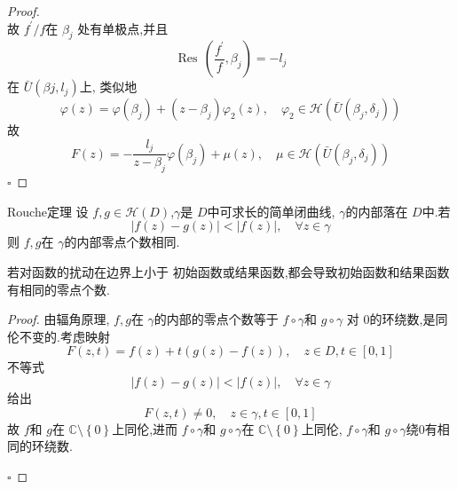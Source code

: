 \documentclass[../../复变函数.tex]{subfiles}
\begin{document}
\begin{proof}
\[    \]故 \(  f^{\prime} /f  \)在 \(  \beta _{j}  \)        处有单极点,并且 \[
    \operatorname{Res}\, \left( \frac{f^{\prime}  }{f },\beta _{j}  \right)= -l_{j} 
    \]
    在 \(  \bar{U}\left( \beta j ,l_{j}\right)   \)上, 类似地\[
     \varphi \left( z \right)=  \varphi \left( \beta _{j} \right)+ \left( z-\beta _{j} \right) \varphi _2 \left( z \right),\quad  \varphi _2 \in \mathcal{H}\left( \bar{U}\left( \beta _{j} , \delta  _{j}\right)  \right)     
    \] 故 \[
    F\left( z \right)= -\frac{l_{j} }{z-\beta _{j} } \varphi \left( \beta _{j} \right)+ \mu \left( z \right),\quad \mu \in \mathcal{H}\left( \bar{U}\left( \beta _{j}, \delta  _{j} \right)  \right)     
    \]
    \hfill $\square$
\end{proof}



\begin{theorem}{Rouche定理}
    设 \(  f,g\in \mathcal{H}\left( D \right)   \),\(   \gamma   \)是 \(  D  \)中可求长的简单闭曲线, \(   \gamma   \)的内部落在 \(  D  \)中.若 \[
    \left| f\left( z \right)-g\left( z \right)   \right|< \left| f\left( z \right)  \right|,\quad \forall z \in  \gamma   
    \]则 \(  f,g  \)在 \(   \gamma   \)的内部零点个数相同.       
\end{theorem}

\begin{note}
    若对函数的扰动在边界上小于 初始函数或结果函数,都会导致初始函数和结果函数有相同的零点个数.
\end{note}
\begin{proof}
    由辐角原理, \(  f,g  \)在 \(   \gamma   \)的内部的零点个数等于 \(  f\circ  \gamma   \)和 \(  g\circ  \gamma   \)  对 \(  0  \)的环绕数,是同伦不变的.考虑映射 \[
    F\left( z,t \right)= f\left( z \right)+ t\left( g\left( z \right)-f\left( z \right)   \right) , \quad z\in D,t \in \left[ 0,1 \right]    
    \] 不等式 \[
    \left| f\left( z \right)-g\left( z \right)   \right|< \left| f\left( z \right)  \right|,\quad \forall z \in  \gamma   
    \]给出 \[
    F\left( z,t \right)\neq 0,\quad z \in  \gamma ,t \in \left[ 0,1 \right]  
    \]故 \(  f  \)和 \(  g  \)在 \(  \mathbb{C} \setminus \left\{ 0 \right\}  \)上同伦,进而 \(  f\circ  \gamma   \)和 \(  g\circ  \gamma   \)在 \(  \mathbb{C} \setminus \left\{ 0 \right\}  \)上同伦, \(  f\circ  \gamma   \)和 \(  g\circ  \gamma   \)绕0有相同的环绕数.        


    \hfill $\square$
\end{proof}
\end{document}

